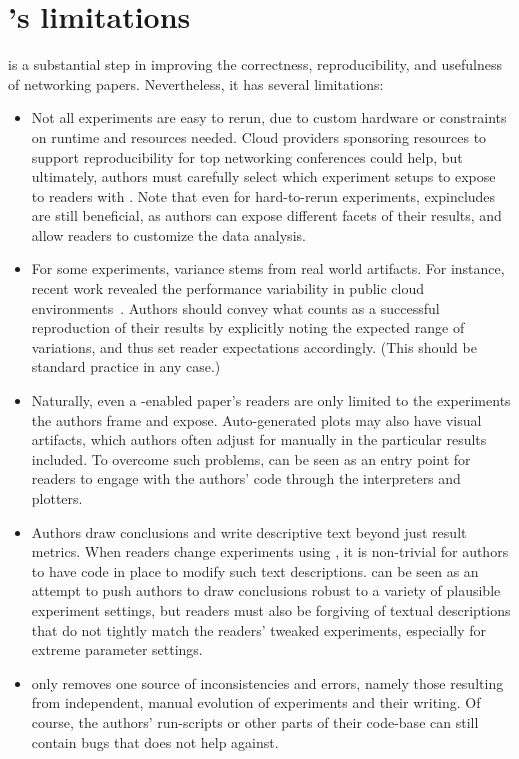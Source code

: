 \section{\sysname's limitations}
\label{sec:limitations}

\sysname is a substantial step in improving the correctness, reproducibility, and usefulness of networking papers. Nevertheless, it has several limitations:

\begin{itemize}[leftmargin=10pt,itemsep=2pt,topsep=2pt]

    \item Not all experiments are easy to rerun, \eg due to custom hardware or constraints on runtime and resources needed. Cloud providers sponsoring resources to support reproducibility for top networking conferences could help, but ultimately, authors must carefully select which experiment setups to expose to readers with \sysname. Note that even for hard-to-rerun experiments, expincludes are still beneficial, as authors can expose different facets of their results, and allow readers to customize the data analysis.
    
    \item For some experiments, variance stems from real world artifacts. For instance, recent work revealed the performance variability in public cloud environments~\cite{nsdi-2020-uta}. Authors should convey what counts as a successful reproduction of their results by explicitly noting the expected range of variations, and thus set reader expectations accordingly. (This should be standard practice in any case.)
    
    \item Naturally, even a \sysname-enabled paper's readers are only limited to the experiments the authors frame and expose. Auto-generated plots may also have visual artifacts, which authors often adjust for manually in the particular results included. To overcome such problems, \sysname can be seen as an entry point for readers to engage with the authors' code through the interpreters and plotters.
    
    \item Authors draw conclusions and write descriptive text beyond just result metrics. When readers change experiments using \sysname, it is non-trivial for authors to have code in place to modify such text descriptions. \sysname can be seen as an attempt to push authors to draw conclusions robust to a variety of plausible experiment settings, but readers must also be forgiving of textual descriptions that do not tightly match the readers' tweaked experiments, especially for extreme parameter settings.
    
    \item \sysname only removes one source of inconsistencies and errors, namely those resulting from independent, manual evolution of experiments and their writing. Of course, the authors' run-scripts or other parts of their code-base can still contain bugs that \sysname does not help against.

\end{itemize}
